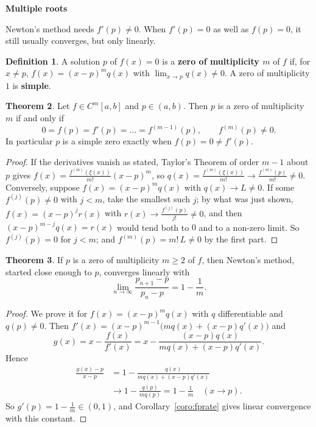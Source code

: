 \documentclass[11pt,a4paper]{article}
\numberwithin{equation}{section}
\theoremstyle{definition}
\newtheorem{thm}{Theorem}[subsection]
\newtheorem{defn}[thm]{Definition}
\newcommand{\subhead}[1]{%
  \par\medskip\noindent\textbf{#1}\par\nobreak\smallskip}
\begin{document}
\subhead{Multiple roots}
Newton's method needs $f'(p)\neq0$. When $f'(p) = 0$ as well as $f(p) = 0$, it still usually converges, but only linearly.

\begin{defn}
A solution $p$ of $f(x) = 0$ is a \textbf{zero of multiplicity $m$} of $f$ if, for $x\neq p$, $f(x) = (x-p)^mq(x)$ with
$\lim_{x\rightarrow p}q(x)\neq0$. A zero of multiplicity $1$ is \textbf{simple}.
\end{defn}

\begin{thm}
\label{thm:multiplicity}
Let $f\in C^m[a,b]$ and $p\in(a,b)$. Then $p$ is a zero of multiplicity $m$ if and only if
$$0 = f(p) = f'(p) = \dots = f^{(m-1)}(p),\qquad f^{(m)}(p)\neq0 .$$
In particular $p$ is a simple zero exactly when $f(p) = 0\neq f'(p)$.
\end{thm}

\begin{proof}
If the derivatives vanish as stated, Taylor's Theorem of order $m-1$ about $p$ gives $f(x) = \frac{f^{(m)}(\xi(x))}{m!}(x-p)^m$, so
$q(x) = \frac{f^{(m)}(\xi(x))}{m!}\longrightarrow\frac{f^{(m)}(p)}{m!}\neq0$. Conversely, suppose $f(x) = (x-p)^mq(x)$ with
$q(x)\longrightarrow L\neq0$. If some $f^{(j)}(p)\neq0$ with $j<m$, take the smallest such $j$; by what was just shown, $f(x) = (x-p)^jr(x)$
with $r(x)\longrightarrow\frac{f^{(j)}(p)}{j!}\neq0$, and then $(x-p)^{m-j}q(x) = r(x)$ would tend both to $0$ and to a non-zero limit.
So $f^{(j)}(p) = 0$ for $j<m$; and $f^{(m)}(p) = m!\,L\neq0$ by the first part.
\end{proof}

\begin{thm}
\label{thm:newtonmult}
If $p$ is a zero of multiplicity $m\geq2$ of $f$, then Newton's method, started close enough to $p$, converges linearly with
$$\lim_{n\rightarrow\infty}\frac{p_{n+1}-p}{p_n-p} = 1-\frac1m .$$
\end{thm}

\begin{proof}
We prove it for $f(x) = (x-p)^mq(x)$ with $q$ differentiable and $q(p)\neq0$. Then $f'(x) = (x-p)^{m-1}\bigl(mq(x)+(x-p)q'(x)\bigr)$ and
$$g(x) = x-\frac{f(x)}{f'(x)} = x-\frac{(x-p)q(x)}{mq(x)+(x-p)q'(x)} .$$
Hence
\begin{align*}
\frac{g(x)-p}{x-p} &= 1-\frac{q(x)}{mq(x)+(x-p)q'(x)}\\
&\longrightarrow1-\frac{q(p)}{mq(p)} = 1-\frac1m\quad(x\longrightarrow p).
\end{align*}
So $g'(p) = 1-\frac1m\in(0,1)$, and Corollary~\ref{coro:fprate} gives linear convergence with this constant.
\end{proof}
\end{document}
